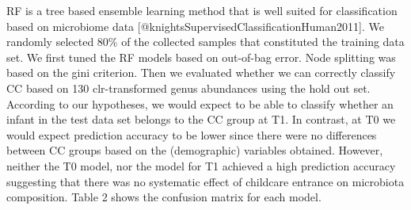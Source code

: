 \documentclass[]{article}
\begin{document}
RF is a tree based ensemble learning method that is well suited for
classification based on microbiome data
{[}@knightsSupervisedClassificationHuman2011{]}. We randomly selected
80\% of the collected samples that constituted the training data set. We
first tuned the RF models based on out-of-bag error. Node splitting was
based on the gini criterion. Then we evaluated whether we can correctly
classify CC based on 130 clr-transformed genus abundances using the hold
out set. According to our hypotheses, we would expect to be able to
classify whether an infant in the test data set belongs to the CC group
at T1. In contrast, at T0 we would expect prediction accuracy to be
lower since there were no differences between CC groups based on the
(demographic) variables obtained. However, neither the T0 model, nor the
model for T1 achieved a high prediction accuracy suggesting that there
was no systematic effect of childcare entrance on microbiota
composition. Table 2 shows the confusion matrix for each model.
\end{document}
